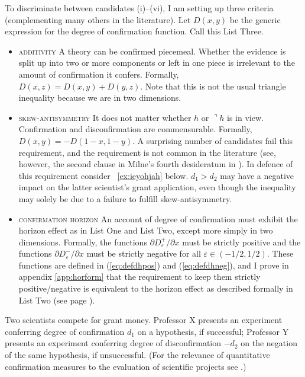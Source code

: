 \documentclass[phd,12pt,oneside]{ubcthesis}
\begin{document}
To discriminate between candidates (i)--(vi), I am setting up three
criteria (complementing many others in the literature). Let $D(x,y)$
be the generic expression for the degree of confirmation function.
Call this List Three\label{page:listthree}.

\begin{itemize}
\item \textsc{additivity} A theory can be confirmed piecemeal. Whether
  the evidence is split up into two or more components or left in one
  piece is irrelevant to the amount of confirmation it confers.
  Formally, $D(x,z)=D(x,y)+D(y,z)$. Note that this is not the usual
  triangle inequality because we are in two dimensions.
\item \textsc{skew-antisymmetry} It does not matter whether $h$ or
  $\urcorner{}h$ is in view. Confirmation and disconfirmation are
  commensurable. Formally, $D(x,y)=-D(1-x,1-y)$. A surprising number
  of candidates fail this requirement, and the requirement is not
  common in the literature (see, however, the second clause in Milne's
  fourth desideratum in ). In defence of this
  requirement consider {\xample}~\ref{ex:ieyohjah} below.
  $d_{1}>{}d_{2}$ may have a negative impact on the latter scientist's
  grant application, even though the inequality may solely be due to a
  failure to fulfill skew-antisymmetry.
\item \textsc{confirmation horizon} An account of degree of
  confirmation must exhibit the horizon effect as in List One and List
  Two, except more simply in two dimensions. Formally, the functions
  $\partial{}D_{\varepsilon}^{+}/\partial{}x$ must be strictly
  positive and the functions
  $\partial{}D_{\varepsilon}^{-}/\partial{}x$ must be strictly
  negative for all $\varepsilon\in{}(-1/2,1/2)$. These functions are
  defined in (\ref{eq:defdhpos}) and (\ref{eq:defdhneg}), and I prove
  in appendix \ref{app:horform} that the requirement to keep them
  strictly positive/neg\-ative is equivalent to the horizon effect as
  described formally in List Two (see page \pageref{page:listtwo}).
\end{itemize}

\begin{quotex}
  \label{ex:ieyohjah} Two scientists
  compete for grant money. Professor X presents an experiment
  conferring degree of confirmation $d_{1}$ on a hypothesis, if
  successful; Professor Y presents an experiment conferring degree of
  disconfirmation $-d_{2}$ on the negation of the same hypothesis, if
  unsuccessful. (For the relevance of quantitative confirmation
  measures to the evaluation of scientific projects see
  .)
\end{quotex}
\end{document}

